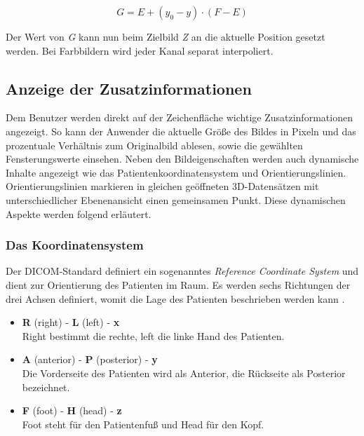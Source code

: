 \begin{equation}
G = E + (y_0 - y) \cdot (F-E)
\end{equation}

Der Wert von \textit{G} kann nun beim Zielbild \textit{Z} an die aktuelle Position gesetzt werden. Bei Farbbildern wird jeder Kanal separat interpoliert.

\subsection{Anzeige der Zusatzinformationen}

Dem Benutzer werden direkt auf der Zeichenfläche wichtige Zusatzinformationen angezeigt. So kann der Anwender die aktuelle Größe des Bildes in Pixeln und das prozentuale Verhältnis zum Originalbild ablesen, sowie die gewählten Fensterungswerte einsehen. Neben den Bildeigenschaften werden auch dynamische Inhalte angezeigt wie das Patientenkoordinatensystem und Orientierungslinien. Orientierungslinien markieren in gleichen geöffneten 3D-Datensätzen mit unterschiedlicher Ebenenansicht einen gemeinsamen Punkt. Diese dynamischen Aspekte werden folgend erläutert.

\subsubsection{Das Koordinatensystem}

Der DICOM-Standard definiert ein sogenanntes \textit{Reference Coordinate System} \cite[S. 55]{dicom:iod} und dient zur Orientierung des Patienten im Raum. Es werden sechs Richtungen der drei Achsen definiert, womit die Lage des Patienten beschrieben werden kann \cite[C.7.6.1.1.1]{dicom:iod}. 

\begin{itemize}
\item \textbf{R} (right) - \textbf{L} (left) - \textbf{x} \\
	Right bestimmt die rechte, left die linke Hand des Patienten.
\item \textbf{A} (anterior) - \textbf{P} (posterior) - \textbf{y} \\
   Die Vorderseite des Patienten wird als Anterior, die Rückseite als Posterior bezeichnet.
\item \textbf{F} (foot) - \textbf{H} (head) - \textbf{z} \\
 Foot steht für den Patientenfuß und Head für den Kopf.
\end{itemize}

